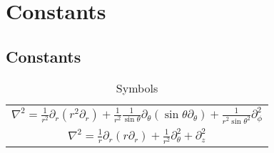 \chapter{Constants}

\section{Constants}
\renewcommand{\arraystretch}{2}
\begin{table}[h]
    \caption{Symbols}
    \label{tab:symbols}
    \begin{center}
	\begin{tabular}{c}
	    \hline  
	    $\displaystyle \nabla^2 = \frac{1}{r^2}\partial_r(r^2 \partial_r) +
	    \frac{1}{r^2}\frac{1}{\sin\theta} \partial_{\theta}(\sin\theta\partial_{\theta}) +
	    \frac{1}{r^2\sin\theta^2}\partial^2_{\phi}$	\\ 

	    $\displaystyle \nabla^2 = \frac{1}{r}\partial_r (r\partial_r) +
	    \frac{1}{r^2}\partial^2_{\theta} + \partial^2_z$ \\
	    \hline
	\end{tabular}
    \end{center}
\end{table}

